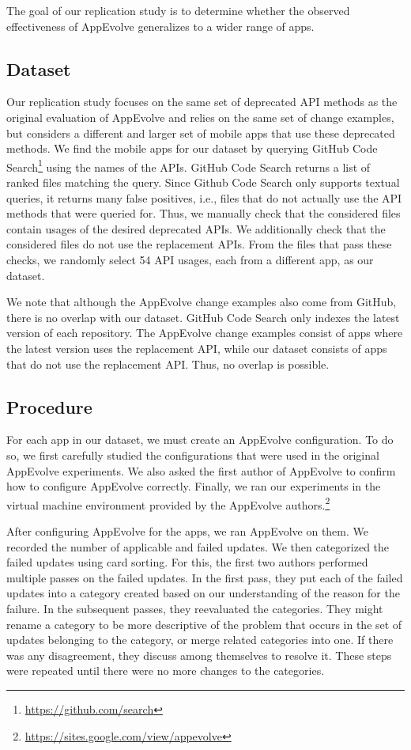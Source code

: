 The goal of our replication study is to determine whether the observed
effectiveness of AppEvolve generalizes to a wider range of apps.

\subsection{Dataset}
Our replication study focuses on the same set of deprecated API methods as the
original evaluation of AppEvolve and relies on the same set of change
examples, but considers a different and larger set of mobile apps that use
these deprecated methods.  We find the mobile apps for our dataset by
querying GitHub Code Search\footnote{\url{https://github.com/search}} using
the names of the APIs. GitHub Code Search returns a list of ranked files
matching the query. Since Github Code Search only supports textual queries,
it returns many false positives, i.e., files that do not actually use the
API methods that were queried for.  Thus, we manually check that the
considered files contain usages of the desired deprecated APIs.  We
additionally check that the considered files do not use the replacement
APIs. From the files that pass these checks, we randomly select 54 API
usages, each from a different app, as our dataset.

We note that although the AppEvolve change examples also come from GitHub,
there is no overlap with our dataset.  GitHub Code Search only indexes the
latest version of each repository.  The AppEvolve change examples consist
of apps where the latest version uses the replacement API, while our
dataset consists of apps that do not use the replacement API.  Thus, no
overlap is possible.

\subsection{Procedure}
For each app in our dataset, we must create an AppEvolve configuration. To
do so, we first carefully studied the configurations that were used in the
original AppEvolve experiments. We also asked the first author of AppEvolve
to confirm how to configure AppEvolve correctly. Finally, we ran our
experiments in the virtual machine environment provided by the AppEvolve
authors.\footnote{\url{https://sites.google.com/view/appevolve}}

After configuring AppEvolve for the apps, we ran AppEvolve on them. We
recorded the number of applicable and failed updates. We then categorized
the failed updates using card sorting\cite{spencer09}. For this, the first two authors performed
multiple passes on the failed updates. In the first pass, they put each
of the failed updates into a category created based on our understanding of
the reason for the failure. In the subsequent passes, they reevaluated the
categories. They might rename a category to be more descriptive of the
problem that occurs in the set of updates belonging to the category, or
merge related categories into one. If there was any disagreement, they discuss among themselves to resolve it. These steps were repeated until there
were no more changes to the categories. 
